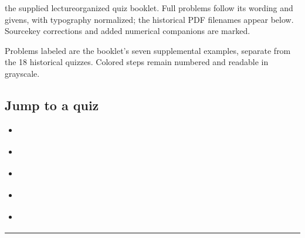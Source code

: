 \documentclass[letterpaper,11pt,english,openany,oneside]{jupyterBook}
\begin{document}
\sphinxAtStartPar
{} the supplied lecture\sphinxhyphen{}organized quiz booklet. Full problems follow its wording and givens, with typography normalized; the historical PDF filenames appear below. Source\sphinxhyphen{}key corrections and added numerical companions are marked.

\sphinxAtStartPar
{} Problems labeled  are the booklet’s seven supplemental examples, separate from the 18 historical quizzes. Colored steps remain numbered and readable in grayscale.


\subsection{Jump to a quiz}
\label{\detokenize{lectures/lecture06/quiz-workbook:jump-to-a-quiz}}\begin{itemize}
\item {}
\sphinxAtStartPar
{\hyperref[\detokenize{lectures/lecture06/quiz-workbook:quiz-source-12}]{}}

\item {}
\sphinxAtStartPar
{\hyperref[\detokenize{lectures/lecture06/quiz-workbook:quiz-source-16}]{}}

\item {}
\sphinxAtStartPar
{\hyperref[\detokenize{lectures/lecture06/quiz-workbook:quiz-source-a5}]{}}

\item {}
\sphinxAtStartPar
{\hyperref[\detokenize{lectures/lecture06/quiz-workbook:quiz-source-a6}]{}}

\item {}
\sphinxAtStartPar
{\hyperref[\detokenize{lectures/lecture06/quiz-workbook:quiz-source-a7}]{}}

\end{itemize}


\bigskip\hrule\bigskip
\end{document}

